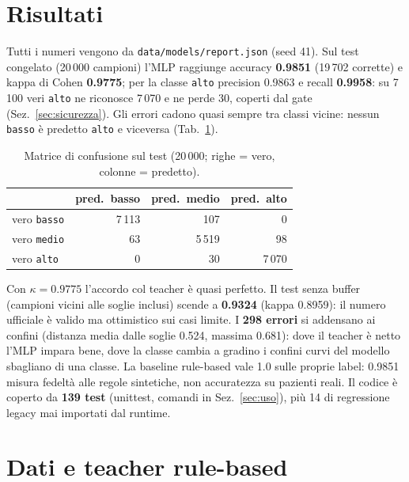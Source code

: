 \documentclass[11pt,a4paper]{article}
\newcommand{\codice}[1]{\texttt{#1}}
\newcommand{\file}[1]{\texttt{#1}}
\begin{document}
\section{Risultati}\label{sec:risultati}

Tutti i numeri vengono da \file{data/models/report.json} (seed 41). Sul test
congelato (20\,000 campioni) l'MLP raggiunge accuracy \textbf{0.9851}
(19\,702 corrette) e kappa di Cohen \textbf{0.9775}; per la classe
\codice{alto} precision 0.9863 e recall \textbf{0.9958}: su 7\,100 veri
\codice{alto} ne riconosce 7\,070 e ne perde 30, coperti dal gate
(Sez.~\ref{sec:sicurezza}). Gli errori cadono quasi sempre tra classi vicine:
nessun \codice{basso} è predetto \codice{alto} e viceversa
(Tab.~\ref{tab:conf}).

\begin{table}[htbp]
\centering
\caption{Matrice di confusione sul test (20\,000; righe = vero, colonne = predetto).}
\label{tab:conf}
\begin{tabular}{lrrr}
\toprule
 & \textbf{pred.\ basso} & \textbf{pred.\ medio} & \textbf{pred.\ alto} \\
\midrule
vero \codice{basso} & 7\,113 & 107 & 0 \\
vero \codice{medio} & 63 & 5\,519 & 98 \\
vero \codice{alto} & 0 & 30 & 7\,070 \\
\bottomrule
\end{tabular}
\end{table}

Con $\kappa=0.9775$ l'accordo col teacher è quasi perfetto. Il test senza
buffer (campioni vicini alle soglie inclusi) scende a \textbf{0.9324} (kappa
0.8959): il numero ufficiale è valido ma ottimistico sui casi limite. I
\textbf{298 errori} si addensano ai confini (distanza media dalle soglie
0.524, massima 0.681): dove il teacher è netto l'MLP impara bene, dove la
classe cambia a gradino i confini curvi del modello sbagliano di una classe.
La baseline rule-based vale 1.0 sulle proprie label: 0.9851 misura fedeltà
alle regole sintetiche, non accuratezza su pazienti reali. Il codice è
coperto da \textbf{139 test} (unittest, comandi in Sez.~\ref{sec:uso}), più 14
di regressione legacy mai importati dal runtime.

\section{Dati e teacher rule-based}\label{sec:dati}
\end{document}
